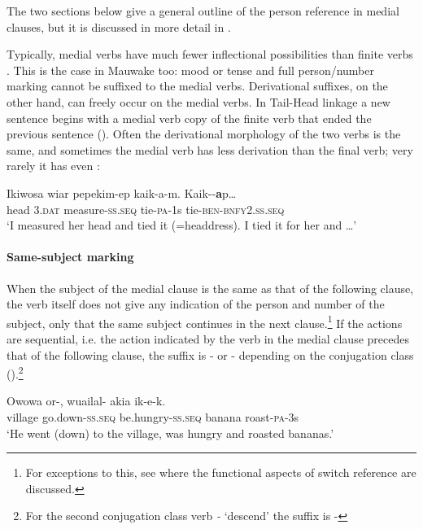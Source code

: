 The two sections below give a general outline of the person reference in medial clauses, but it is discussed in more detail in .

Typically, medial verbs have much fewer inflectional possibilities than finite verbs \citep[11]{Foley1986}. This is the case in Mauwake too: mood or tense and full person/number marking cannot be suffixed to the medial verbs. Derivational suffixes, on the other hand, can freely occur on the medial verbs. In Tail-Head linkage a new sentence begins with a medial verb copy of the finite verb that ended the previous sentence (). Often the derivational morphology of the two verbs is the same, and sometimes the medial verb has less derivation than the final verb; very rarely it has even  :

\ea%
\label{ex:3:x237}
\gll Ikiwosa wiar pepekim-ep kaik-a-m. Kaik--\textbf{a}p{\dots} \\
head 3.\textsc{dat} measure-\textsc{ss}.\textsc{seq} tie-\textsc{pa}-1s tie-\textsc{ben}-\textsc{bnfy}2.\textsc{ss}.\textsc{seq}\\
\glt`I measured her head and tied it (=headdress). I tied it for her and {\dots}'
\z

\paragraph{Same-subject marking}\label{sec:3.8.3.5.1}
{}
When the subject of the medial clause is the same as that of the following clause, the verb itself does not give any indication of the person and number of the subject, only that the same subject continues in the next clause.\footnote{For exceptions to this, see  where the functional aspects of switch reference are discussed.} If the actions are sequential, i.e. the action indicated by the verb in the medial clause precedes that of the following clause, the suffix is \nobreakdash- or \nobreakdash-  depending on the conjugation class ().\footnote{For the second conjugation class verb \textit{-} `descend' the suffix is -} 

\ea%
\label{ex:3:x238}
\gll Owowa or-, wuailal- akia ik-e-k. \\
village go.down-\textsc{ss}.\textsc{seq} be.hungry-\textsc{ss}.\textsc{seq} banana roast-\textsc{pa}-3s \\
\glt`He went (down) to the village, was hungry and roasted bananas.' 
\z

